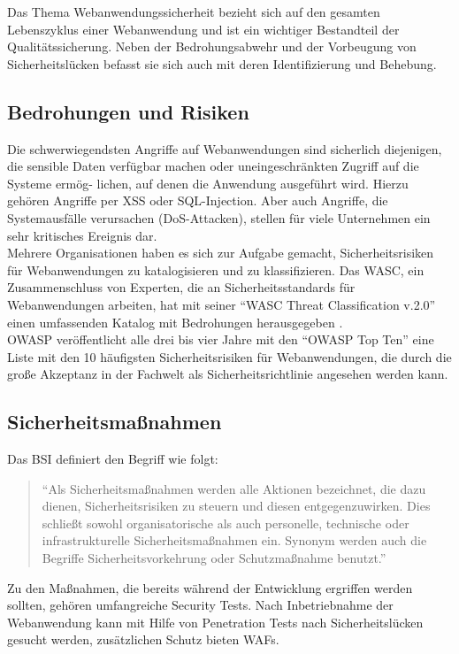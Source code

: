 \documentclass[12pt,oneside,a4paper,parskip,pointlessnumbers]{scrbook}
\begin{document}
  Das Thema Webanwendungssicherheit bezieht sich auf den gesamten Lebenszyklus einer Webanwendung und ist ein wichtiger Bestandteil der Qualitätssicherung. Neben der Bedrohungsabwehr und der Vorbeugung von Sicherheitslücken befasst sie sich auch mit deren Identifizierung und Behebung. \cite{BSI}

  \subsection{Bedrohungen und Risiken}
  Die schwerwiegendsten Angriffe auf Webanwendungen sind sicherlich diejenigen, die sensible Daten verfügbar machen oder uneingeschränkten Zugriff auf die Systeme ermög- lichen, auf denen die Anwendung ausgeführt wird. Hierzu gehören Angriffe per \ac{XSS} oder SQL-Injection. Aber auch Angriffe, die Systemausfälle verursachen (\ac{DoS}-Attacken), stellen für viele Unternehmen ein sehr kritisches Ereignis dar.\\
  Mehrere Organisationen haben es sich zur Aufgabe gemacht, Sicherheitsrisiken für Webanwendungen zu katalogisieren und zu klassifizieren. Das \ac{WASC}, ein Zusammenschluss von Experten, die an Sicherheitsstandards für Webanwendungen arbeiten, hat mit seiner ``WASC Threat Classification v.2.0'' einen umfassenden Katalog mit Bedrohungen herausgegeben \cite{WASC}.\\
  OWASP veröffentlicht alle drei bis vier Jahre mit den ``OWASP Top Ten'' \cite{OWASPtop10} eine Liste mit den 10 häufigsten Sicherheitsrisiken für Webanwendungen, die durch die große Akzeptanz in der Fachwelt als Sicherheitsrichtlinie angesehen werden kann.


  \subsection{Sicherheitsmaßnahmen}
  Das BSI definiert den Begriff wie folgt:
    \begin{quote} ``Als Sicherheitsmaßnahmen werden alle Aktionen bezeichnet, die dazu dienen, Sicherheitsrisiken zu steuern und diesen entgegenzuwirken. Dies schließt sowohl organisatorische als auch personelle, technische oder infrastrukturelle Sicherheitsmaßnahmen ein. Synonym werden auch die Begriffe Sicherheitsvorkehrung oder Schutzmaßnahme benutzt.'' \cite[S.107-108]{BSI2}\end{quote}

 Zu den Maßnahmen, die bereits während der Entwicklung ergriffen werden sollten, gehören umfangreiche Security Tests. Nach Inbetriebnahme der Webanwendung kann mit Hilfe von Penetration Tests nach Sicherheitslücken gesucht werden, zusätzlichen Schutz bieten \acp{WAF}.
\end{document}
